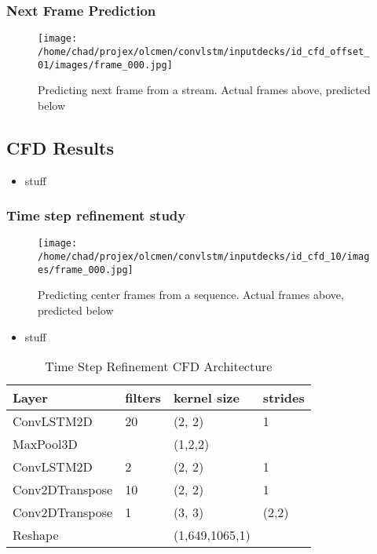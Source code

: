 \documentclass{article}
\begin{document}
\subsubsection{Next Frame Prediction}
\begin{figure}
    \texttt{[image: /home/chad/projex/olcmen/convlstm/inputdecks/id\_cfd\_offset\_01/images/frame\_000.jpg]}
    \caption{Predicting next frame from a stream.  Actual frames above, predicted below}
\end{figure}

\subsection{CFD Results}
\begin{itemize}
    \item   stuff
\end{itemize}

\subsubsection{Time step refinement study}
\begin{figure}
    \texttt{[image: /home/chad/projex/olcmen/convlstm/inputdecks/id\_cfd\_10/images/frame\_000.jpg]}
    \caption{Predicting center frames from a sequence.  Actual frames above, predicted below}
\end{figure}

\begin{itemize}
    \item   stuff
\end{itemize}

\begin{table}
    \begin{center}
        \caption{Time Step Refinement CFD Architecture}
        \begin{tabular}{l|l|l|l}
            \hline
            Layer & filters & kernel size & strides\\
            \hline
            ConvLSTM2D      & 20 &   (2, 2)  & 1\\
            MaxPool3D       &    &   (1,2,2) &\\
            ConvLSTM2D      & 2  &   (2, 2)  & 1\\
            Conv2DTranspose & 10 &   (2, 2)  & 1\\
            Conv2DTranspose & 1  &   (3, 3)  & (2,2)\\
            Reshape & & (1,649,1065,1)&\\
        \end{tabular}
    \end{center}
\end{table}
\end{document}
